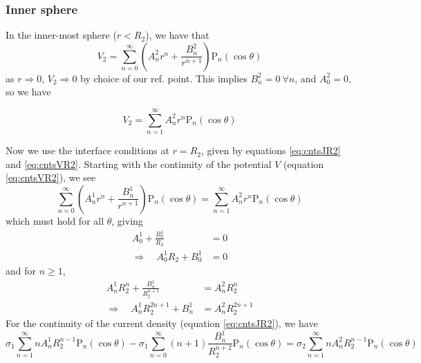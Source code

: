 \subsubsection{Inner sphere}
In the inner-most sphere ($r<R_2$), we have that
    \begin{displaymath}
        V_2 = \sum_{n=0}^{\infty} \left(A_n^2 r^n + \frac{B_n^2}{r^{n+1}}\right) \text{P}_n(\cos\theta)
    \end{displaymath}
as $r \Rightarrow 0$, $V_2 \Rightarrow 0$ by choice of our ref. point. This implies $B_n^2=0 ~ \forall n$, and $A_0^2 = 0$, so we have
\begin{mdframed}[backgroundcolor=gray!10, innertopmargin=0pt, innerbottommargin=10pt]
    \begin{equation}
        V_2 = \sum_{n=1}^{\infty} A_n^2 r^n \text{P}_n(\cos\theta)
        \label{eq:V2}
    \end{equation}
\end{mdframed}
Now we use the interface conditions at $r = R_2$, given by equations \ref{eq:cntsJR2} and \ref{eq:cntsVR2}. Starting with the continuity of the potential $V$ (equation \ref{eq:cntsVR2}), we see
    $$
        \sum_{n = 0}^{\infty}\left(A_n^1r^n + \frac{B_n^1}{r^{n+1}}\right)\text{P}_n(\cos\theta)
        =
        \sum_{n=1}^{\infty} A_n^2 r^n \text{P}_n(\cos\theta)
    $$
which must hold for all $\theta$, giving
    \begin{equation}
        \begin{split}
        A_0^1 + \frac{B_0^1}{R_2}
        &=
        0 \\
        \Rightarrow \quad
        A_0^1R_2 + B_0^1 &= 0
        \end{split}
        \label{eq:coeff7}
    \end{equation}
and for $n \geq 1$,
    \begin{equation}
    \begin{split}
        A_n^1R_2^n + \frac{B_n^1}{R_2^{n+1}}
        &=
        A_n^2 R_2^n \\
        \Rightarrow \quad
        A_n^1R_2^{2n+1} + B_n^1
        &=
        A_n^2 R_2^{2n+1}
        \end{split}
        \label{eq:coeff8}
    \end{equation}
For the continuity of the current density (equation \ref{eq:cntsJR2}), we have
    $$
        \sigma_1 \sum_{n=1}^\infty n A_n^1 R_2^{n-1}\text{P}_n(\cos\theta)
        - \sigma_1 \sum_{n=0}^\infty (n+1)\frac{B_n^1}{R_2^{n+2}} \text{P}_n(\cos\theta)
        =
        \sigma_2 \sum_{n=1}^\infty n A_n^2 R_2^{n-1}\text{P}_n(\cos\theta)
    $$

